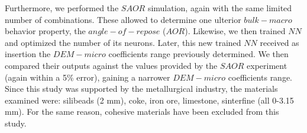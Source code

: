 Furthermore, we performed the $SAOR$ simulation, again with the same limited number of combinations.
These allowed to determine one ulterior $bulk-macro$ behavior property, the
$angle-of-repose$ ($AOR$).
Likewise, we then trained $NN$ and optimized the number of its neurons.
Later, this new trained $NN$ received as insertion the $DEM-micro$ coefficients
range previously determined.
We then compared their outputs against the values provided by the $SAOR$ experiment (again within a 5\% error), gaining a narrower $DEM-micro$ coefficients range.
Since this study was supported by the metallurgical industry, the materials
examined were: silibeads (2 mm), coke, iron ore, limestone, sinterfine (all
0-3.15 mm).
For the same reason, cohesive materials have been excluded from this study.\\ \label{par:materials}